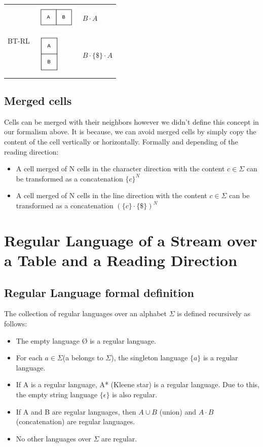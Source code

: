 \documentclass{article}
\begin{document}
\begin{longtable}{|m{}|m{}|m{}|}
\hline
    \multirow{2}{*}{BT-RL} & \includegraphics{table-h} & $B \cdot A$ \\
\cline{2-3} 
                           & \includegraphics{table-v} & $B \cdot \{\$\} \cdot A$ \\
\hline
\end{longtable}

\subsection{Merged cells}
Cells can be merged with their neighbors however we didn't define this concept in our formalism above. It is because, we
can avoid merged cells by simply copy the content of the cell vertically or horizontally. Formally and depending of the
reading direction:
\begin{itemize}
    \item A cell merged of N cells in the character direction with the content $c \in \Sigma$ can be transformed as a
    concatenation $\{c\}^N$
    \item A cell merged of N cells in the line direction with the content $c \in \Sigma$ can be transformed as a
    concatenation $(\{c\} \cdot \{\$\})^N$
\end{itemize}

\section{Regular Language of a Stream over a Table and a Reading Direction}

\subsection{Regular Language formal definition}
The collection of regular languages over an alphabet $\Sigma$ is defined recursively as follows:
\begin{itemize}
    \item The empty language Ø is a regular language.
    \item For each $a \in \Sigma$(a belongs to $\Sigma$), the singleton language $\{a\}$ is a regular language.
    \item If A is a regular language, A* (Kleene star) is a regular language. Due to this, the empty string language
    $\{\epsilon\}$ is also regular.
    \item If A and B are regular languages, then $A \cup B$ (union) and $A \cdot B$ (concatenation) are regular languages.
    \item No other languages over $\Sigma$ are regular.
\end{itemize}
\end{document}
